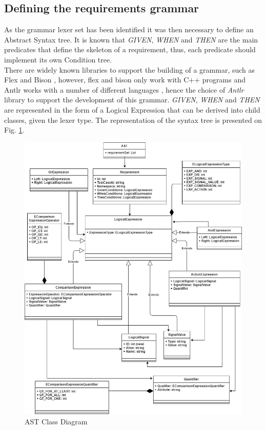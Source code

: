 \subsection{Defining the requirements grammar}
\label{sec:def_req_grammar}

As the grammar lexer set has been identified it was then necessary to define an Abstract Syntax tree. It is known that \textit{GIVEN}, \textit{WHEN} and \textit{THEN} are the main predicates that define the skeleton of a requirement, thus, each predicate should implement its own Condition tree.\\
There are widely known libraries to support the building of a grammar, such as Flex and Bison \cite{levine_flex_2009}, however, flex and bison only work with C++ programs and Antlr works with a number of different languages \cite{antlr_site}, hence the choice of \textit{Antlr} library to support the development of this grammar. \textit{GIVEN}, \textit{WHEN} and \textit{THEN} are represented in the form of a Logical Expression that can be derived into child classes, given the lexer type. The representation of the syntax tree is presented on Fig. \ref{fig:ast_class_diagram}.

% 
\begin{figure}[H]
    \centering
    \includegraphics[width=\textwidth]{images/grammar_class_diagram.drawio.png}
    \caption{AST Class Diagram}
    \label{fig:ast_class_diagram}
\end{figure}


